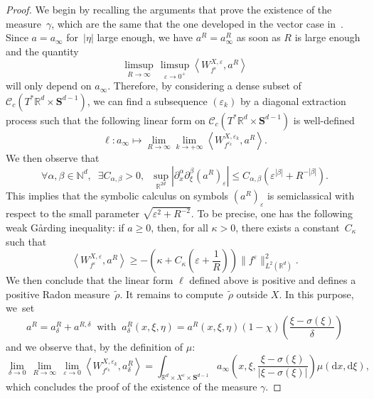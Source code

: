 \documentclass[AHL,Unicode,longabstracts]{cedram}
\newcommand*\R{{\mathbb R}}
\newcommand*\N{{\mathbb N}}
\newcommand*\eps{\varepsilon}
\numberwithin{equation}{section}
\let\oldexists\exists
\renewcommand*{\exists}{\mathrel{\oldexists}}
\let\oldforall\forall
\renewcommand*{\forall}{\mathrel{\oldforall}}
\newcommand*{\dd}{\mathrm{d}}
\newcommand*{\dx}{\dd x}
\newcommand*{\dxi}{\dd \xi}
\begin{document}
\begin{proof}
We begin by recalling the arguments that prove the existence of the measure~$\gamma$, which are the same that the one developed in the vector case in~\cite{CFMProc}.
Since $a=a_\infty$ for~$|\eta|$ large enough, we have $a^R=a_\infty^R$ as soon as $R$ is large enough and the quantity
\[
\limsup_{R\to\infty}\, \limsup_{\eps\to 0^+}\left\langle W^{X,\eps}_{f^\eps},a^{R}\right\rangle
\]
will only depend on $a_\infty$. Therefore, by considering a dense subset of ${\mathcal C}_c(T^*\R^{d}\times \mathbf{S}^{d-1})$, we can find a subsequence $(\eps_k)$ by a diagonal extraction process such that the following linear form on ${\mathcal C}_c(T^*\R^{d}\times \mathbf{S}^{d-1})$ is well-defined
\[
\ell : a_\infty\mapsto \lim_{R\to\infty} \lim_{k\to +\infty}\left\langle W^{X,\eps_k}_{f^{\eps_k}},a^{R}\right\rangle.
\]
We then observe that
\[
\forall \alpha,\beta\in\N^d,\;\;\exists C_{\alpha,\beta}>0,\;\;\sup_{\R^{2d}}\left| \partial_x^\alpha\partial_\xi^\beta \left(a^{R}\right)_\eps\right|\leq C_{\alpha,\beta}\left(\eps^{|\beta|}+R^{-|\beta|}\right).
\]
This implies that the symbolic calculus on symbols $(a^R)_\eps$ is semiclassical with respect to the small parameter $\sqrt{\eps^2+R^{-2}}$. To be precise, one has the following weak G\aa rding inequality: if $a\geq 0$, then, for all $\kappa>0$, there exists a constant~$C_\kappa$ such that
\[
\left\langle W^{X,\eps}_{f^\eps},a^{R}\right\rangle \geq -\left(\kappa + C_\kappa \left(\eps+\frac{1}{R}\right) \right)\| f^\eps\|^2_{L^2(\R^d)}.
\]
We then conclude that the linear form $\ell$ defined above is positive and defines a positive Radon measure~$\widetilde \rho$. It remains to compute~$\widetilde\rho$ outside $X$. In this purpose, we~set
\[
a^R=a^R_\delta+a^{R,\delta}\;\;\text{with}\;\; a^{R}_{\delta}(x,\xi,\eta)= a^R(x,\xi,\eta)(1-\chi)\left(\frac{\xi-\sigma(\xi)}{\delta}\right)
\]
and we observe that, by the definition of $\mu$:
\[
\lim_{\delta\rightarrow 0} \, \lim_{R\to\infty}\,\lim_{\eps\rightarrow 0} \left\langle W^{X,\eps_k}_{f^{\eps_k}},a^{R}_{\delta}\right\rangle
= \int_{\R^d\times X^c\times \mathbf{S}^{d-1}} a_\infty \left(x,\xi,\frac{\xi-\sigma(\xi)}{|\xi-\sigma(\xi)|}\right)\mu(\dx,\dxi),
\]
which concludes the proof of the existence of the measure $\gamma$.



\end{proof}
\end{document}

